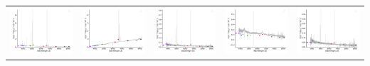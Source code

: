 \begin{center}
\begin{longtable}{l l l l l }
    \includegraphics[width=0.19\linewidth, clip]{Figs/Figs-sdss/spec-0410-51877-0217-STRIPE82-0063-024542.pdf} & \includegraphics[width=0.19\linewidth, clip]{Figs/Figs-sdss/spec-0410-51877-0492-STRIPE82-0064-042346.pdf} & \includegraphics[width=0.19\linewidth, clip]{Figs/Figs-sdss/spec-0410-51877-0519-STRIPE82-0064-031755.pdf} & \includegraphics[width=0.19\linewidth, clip]{Figs/Figs-sdss/spec-0410-51877-0527-STRIPE82-0064-069216.pdf} & \includegraphics[width=0.19\linewidth, clip]{Figs/Figs-sdss/spec-0501-52235-0474-SPLUS-n03n01-003922.pdf} \\

\end{longtable}
\end{center}
